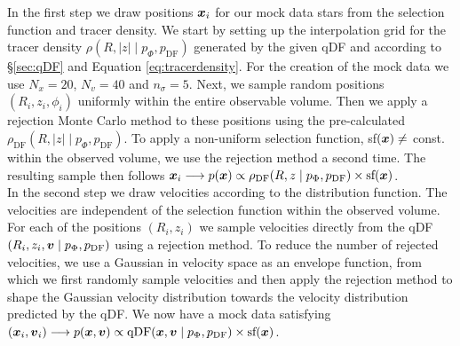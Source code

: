 In the first step we draw positions $\boldsymbol{x}_i$ for our mock data stars from the selection function and tracer density. We start by setting up the interpolation grid for the tracer density $\rho(R,|z| \mid p_\Phi, p_\text{DF})$ generated by the given qDF and according to \S\ref{sec:qDF} and Equation \ref{eq:tracerdensity}. For the creation of the mock data we use $N_x = 20$, $N_v = 40$ and $n_\sigma=5$. Next, we sample random positions $(R_i,z_i,\phi_i)$ uniformly within the entire observable volume. Then we apply a rejection Monte Carlo method to these positions using the pre-calculated $\rho_\text{DF}(R,|z| \mid p_{\Phi},p_\text{DF})$. To apply a non-uniform selection function, sf$(\boldsymbol{x}) \neq $ const. within the observed volume, we use the rejection method a second time. The resulting sample then follows $\boldsymbol{x}_i \longrightarrow p(\boldsymbol{x}) \propto \rho_\text{DF}(R,z \mid p_{\Phi},p_\text{DF}) \times \text{sf}(\boldsymbol{x})$.\\

In the second step we draw velocities according to the distribution function. The velocities are independent of the selection function within the observed volume. For each of the positions $(R_i,z_i)$ we sample velocities directly from the qDF$(R_i,z_i,\boldsymbol{v} \mid p_{\Phi},p_\text{DF})$ using a rejection method. To reduce the number of rejected velocities, we use a Gaussian in velocity space as an envelope function, from which we first randomly sample velocities and then apply the rejection method to shape the Gaussian velocity distribution towards the velocity distribution predicted by the qDF. We now have a mock data satisfying $(\boldsymbol{x}_i,\boldsymbol{v}_i) \longrightarrow p(\boldsymbol{x},\boldsymbol{v}) \propto \text{qDF}(\boldsymbol{x},\boldsymbol{v} \mid p_{\Phi},p_\text{DF}) \times \text{sf}(\boldsymbol{x})$.\\


